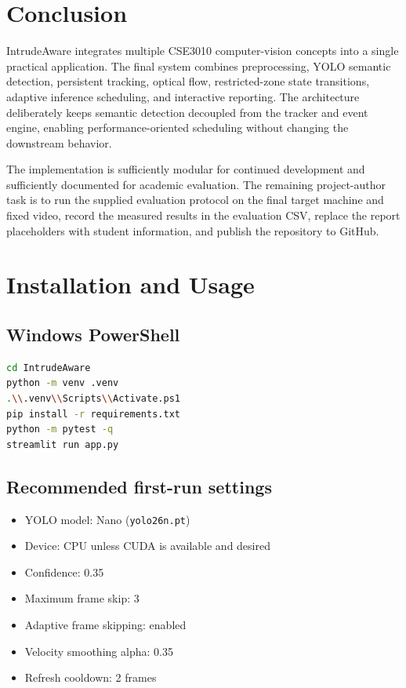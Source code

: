\documentclass[12pt,a4paper]{report}
\newcommand{\code}[1]{\texttt{#1}}
\begin{document}
\chapter{Conclusion}
IntrudeAware integrates multiple CSE3010 computer-vision concepts into a single practical application. The final system combines preprocessing, YOLO semantic detection, persistent tracking, optical flow, restricted-zone state transitions, adaptive inference scheduling, and interactive reporting. The architecture deliberately keeps semantic detection decoupled from the tracker and event engine, enabling performance-oriented scheduling without changing the downstream behavior.

The implementation is sufficiently modular for continued development and sufficiently documented for academic evaluation. The remaining project-author task is to run the supplied evaluation protocol on the final target machine and fixed video, record the measured results in the evaluation CSV, replace the report placeholders with student information, and publish the repository to GitHub.

\appendix
\chapter{Installation and Usage}
\section{Windows PowerShell}
\begin{lstlisting}[language=bash]
cd IntrudeAware
python -m venv .venv
.\\.venv\\Scripts\\Activate.ps1
pip install -r requirements.txt
python -m pytest -q
streamlit run app.py
\end{lstlisting}

\section{Recommended first-run settings}
\begin{itemize}[leftmargin=*]
  \item YOLO model: Nano (\code{yolo26n.pt})
  \item Device: CPU unless CUDA is available and desired
  \item Confidence: 0.35
  \item Maximum frame skip: 3
  \item Adaptive frame skipping: enabled
  \item Velocity smoothing alpha: 0.35
  \item Refresh cooldown: 2 frames
\end{itemize}
\end{document}
